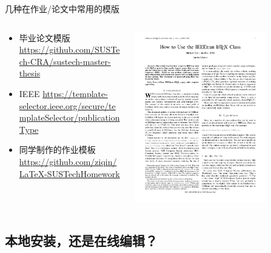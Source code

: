\begin{frame}{几种在作业/论文中常用的模版}
	\begin{columns}[c]
		\begin{column}{.45\textwidth}
			\begin{itemize}
				\item 毕业论文模版 \url{https://github.com/SUSTech-CRA/sustech-master-thesis}
				\item IEEE \url{https://template-selector.ieee.org/secure/templateSelector/publicationType}
				\item 同学制作的作业模板 \url{https://github.com/ziqin/LaTeX-SUSTechHomework}
			\end{itemize}
		\end{column}
		\begin{column}{.45\textwidth}
			\includegraphics[width=0.75\textwidth]{docs/IEEE_template_1.pdf}
		\end{column}
	\end{columns}
\end{frame}


\subsection{本地安装，还是在线编辑？}


